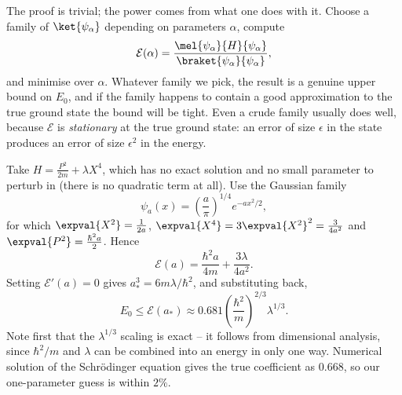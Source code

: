 The proof is trivial; the power comes from what one does with it. Choose a family of  $\ket{\psi_\alpha}$ depending on parameters $\alpha$, compute
$$
\mathcal{E}(\alpha) = \frac{\mel{\psi_\alpha}{H}{\psi_\alpha}}{\braket{\psi_\alpha}{\psi_\alpha}},
$$
and minimise over $\alpha$. Whatever family we pick, the result is a genuine upper bound on $E_0$, and if the family happens to contain a good approximation to the true ground state the bound will be tight. Even a crude family usually does well, because $\mathcal{E}$ is \emph{stationary} at the true ground state: an error of size $\epsilon$ in the state produces an error of size $\epsilon^2$ in the energy.

\begin{center}
\end{center}

\begin{example}
    Take $H = \frac{P^2}{2m} + \lambda X^4$, which has no exact solution and no small parameter to perturb in (there is no quadratic term at all). Use the Gaussian family
    $$
    \psi_a(x) = \left(\frac{a}{\pi}\right)^{1/4}e^{-ax^2/2},
    $$
    for which $\expval{X^2} = \frac{1}{2a}$, $\expval{X^4} = 3\expval{X^2}^2 = \frac{3}{4a^2}$ and $\expval{P^2} = \frac{\hbar^2 a}{2}$. Hence
    $$
    \mathcal{E}(a) = \frac{\hbar^2 a}{4m} + \frac{3\lambda}{4a^2}.
    $$
    Setting $\mathcal{E}'(a) = 0$ gives $a_*^3 = 6m\lambda/\hbar^2$, and substituting back,
    $$
    E_0 \leq \mathcal{E}(a_*) \approx 0.681 \left( \frac{\hbar^2}{m} \right)^{2/3}\lambda^{1/3}.
    $$
    Note first that the $\lambda^{1/3}$ scaling is exact -- it follows from dimensional analysis, since $\hbar^2/m$ and $\lambda$ can be combined into an energy in only one way. Numerical solution of the Schr\"odinger equation gives the true coefficient as $0.668$, so our one-parameter guess is within $2\%$.
\end{example}

